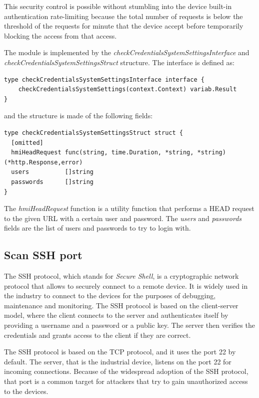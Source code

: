This security control is possible without stumbling into the device built-in authentication rate-limiting because the total number of requests is below the threshold of the requests for minute that the device accept before temporarily blocking the access from that access.

The module is implemented by the \textit{checkCredentialsSystemSettingsInterface} and \textit{checkCredentialsSystemSettingsStruct} structure. The interface is defined as:

\begin{lstlisting}[style=golang]
type checkCredentialsSystemSettingsInterface interface {
	checkCredentialsSystemSettings(context.Context) variab.Result
}
\end{lstlisting}

and the structure is made of the following fields:

\begin{lstlisting}[style=golang]
type checkCredentialsSystemSettingsStruct struct {
  [omitted]
  hmiHeadRequest func(string, time.Duration, *string, *string) (*http.Response,error)
  users          []string
  passwords      []string
}
\end{lstlisting}

The \textit{hmiHeadRequest} function is a utility function that performs a HEAD request to the given URL with a certain user and password. The \textit{users} and \textit{passwords} fields are the list of users and passwords to try to login with.

\subsection{Scan SSH port}

The SSH protocol, which stands for \textit{Secure Shell}, is a cryptographic network protocol that allows to securely connect to a remote device. It is widely used in the industry to connect to the devices for the purposes of debugging, maintenance and monitoring. The SSH protocol is based on the client-server model, where the client connects to the server and authenticates itself by providing a username and a password or a public key. The server then verifies the credentials and grants access to the client if they are correct.

The SSH protocol is based on the TCP protocol, and it uses the port 22 by default. The server, that is the industrial device, listens on the port 22 for incoming connections. Because of the widespread adoption of the SSH protocol, that port is a common target for attackers that try to gain unauthorized access to the devices.

